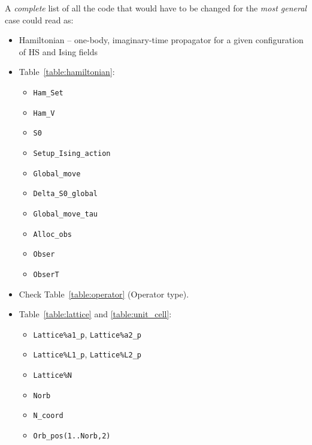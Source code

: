 \noindent A \emph{complete} list of all the code that would have to be changed for the \emph{most general} case could read as:

\begin{itemize}
	\item Hamiltonian -- one-body, imaginary-time propagator for a given configuration of HS and  Ising fields
	\item Table~\ref{table:hamiltonian}:
	\begin{itemize}
		\item \texttt{Ham\_Set}
		\item \texttt{Ham\_V}
		\item \texttt{S0}
		\item \texttt{Setup\_Ising\_action}
		\item \texttt{Global\_move}
		\item \texttt{Delta\_S0\_global}
		\item \texttt{Global\_move\_tau}
		\item \texttt{Alloc\_obs}
		\item \texttt{Obser}
		\item \texttt{ObserT}
	\end{itemize}
	\item Check Table~\ref{table:operator} (Operator type).
	\item Table~\ref{table:lattice} and \ref{table:unit_cell}:
	\begin{itemize}
		\item \texttt{Lattice\%a1\_p}, \texttt{Lattice\%a2\_p}
		\item \texttt{Lattice\%L1\_p}, \texttt{Lattice\%L2\_p}
		\item \texttt{Lattice\%N}
		\item \texttt{Norb}
		\item \texttt{N\_coord}
		\item \texttt{Orb\_pos(1..Norb,2)}
	\end{itemize}
\end{itemize}


